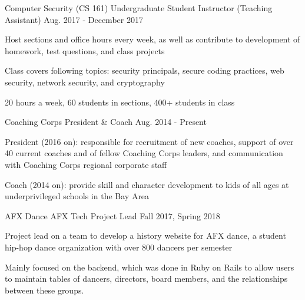 \vspace{-4mm}
\vspace{-2mm}


\begin{cventries}

  \cventry
    {Computer Security (CS 161)} %
    {Undergraduate Student Instructor (Teaching Assistant)} %
    {Aug. 2017 - December 2017} %
    {} %
    {
      \begin{cvitems} %
        \item {Host sections and office hours every week, as well as contribute to development of homework, test questions, and class projects}
        \item {Class covers following topics: security principals, secure coding practices, web security, network security, and cryptography}
        \item {20 hours a week, 60 students in sections, 400+ students in class}
      \end{cvitems}
    }
 
  \cventry
    {Coaching Corps} %
    {President \& Coach} %
    {Aug. 2014 - Present} %
    {} %
    {
      \begin{cvitems} %
        \item {President (2016 on): responsible for recruitment of new coaches, support of over 40 current coaches and of fellow Coaching Corps leaders, and communication with Coaching Corps regional corporate staff}
        \item {Coach (2014 on): provide skill and character development to kids of all ages at underprivileged schools in the Bay Area}
      \end{cvitems}
    }
   \cventry
    {AFX Dance} %
    {AFX Tech Project Lead} %
    {Fall 2017, Spring 2018} %
    {} %
    {
      \begin{cvitems} %
        \item {Project lead on a team to develop a history website for AFX dance, a student hip-hop dance organization with over 800 dancers per semester}
        \item {Mainly focused on the backend, which was done in Ruby on Rails to allow users to maintain tables of dancers, directors, board members, and the relationships between these groups.}
      \end{cvitems}
     }


\end{cventries}

